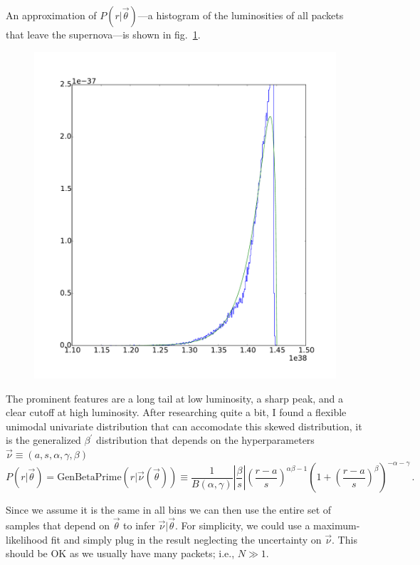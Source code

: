 \documentclass[a4,12pt]{article}
\newcommand{\betap}{\ensuremath{\beta^\prime}}
\newcommand{\genbetapr}{\ensuremath{\mathrm{GenBetaPrime}}}
\newcommand{\vecnu}{\ensuremath{\vec{\nu}}}
\newcommand{\vecth}{\ensuremath{{\vec{\theta}}}}
\def \reffig#1{fig.~\ref{fig:#1}}
\begin{document}
An approximation of $P(r | \vecth)$---a histogram of the luminosities
of all packets that leave the supernova---is shown in
\reffig{hist}.
\begin{figure}[h]
  \begin{center}
    \includegraphics[width=\textwidth]{fit}
  \end{center}
  \caption{
  }
  \label{fig:hist}
\end{figure}
The prominent features are a long tail at low luminosity, a sharp
peak, and a clear cutoff at high luminosity.  After researching quite
a bit, I found a flexible unimodal univariate distribution that can
accomodate this skewed distribution, it is the generalized \betap{}
distribution that depends on the hyperparameters $\vecnu \equiv (a, s,
\alpha, \gamma, \beta)$
\begin{equation}
  \label{eq:betaprime}
  P(r | \vecth) = \genbetapr(r | \vecnu(\vecth)) \equiv \frac{1}{B(\alpha, \gamma)} \left|\frac{\beta}{s} \right| \left( \frac{r - a}{s} \right)^{\alpha \beta - 1} \left(1+\left( \frac{r - a}{s} \right)^{\beta} \right)^{-\alpha - \gamma} \,.
\end{equation}

Since we assume it is the same in all bins we can then use the entire
set of samples that depend on $\vecth$ to infer $\vecnu | \vecth$. For
simplicity, we could use a maximum-likelihood fit and simply plug in
the result neglecting the uncertainty on $\vecnu$. This should be OK
as we usually have many packets; i.e., $N \gg 1$.
\end{document}
